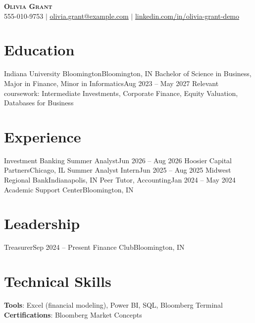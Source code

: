 

\begin{center}
    \textbf{\Huge \scshape Olivia Grant} \\ \vspace{1pt}
    \small 555-010-9753 $|$ \href{mailto:olivia.grant@example.com}{\underline{olivia.grant@example.com}} $|$
    \href{https://linkedin.com/in/olivia-grant-demo}{\underline{linkedin.com/in/olivia-grant-demo}}
\end{center}

\section{Education}
  \resumeSubHeadingListStart
    \resumeSubheading
      {Indiana University Bloomington}{Bloomington, IN}
      {Bachelor of Science in Business, Major in Finance, Minor in Informatics}{Aug 2023 -- May 2027}
  \resumeSubHeadingListEnd
  \small{Relevant coursework: Intermediate Investments, Corporate Finance, Equity Valuation, Databases for Business}

\section{Experience}
  \resumeSubHeadingListStart
    \resumeSubheading
      {Investment Banking Summer Analyst}{Jun 2026 -- Aug 2026}
      {Hoosier Capital Partners}{Chicago, IL}
      \resumeItemListStart
      \resumeItemListEnd
    \resumeSubheading
      {Summer Analyst Intern}{Jun 2025 -- Aug 2025}
      {Midwest Regional Bank}{Indianapolis, IN}
      \resumeItemListStart
      \resumeItemListEnd
    \resumeSubheading
      {Peer Tutor, Accounting}{Jan 2024 -- May 2024}
      {Academic Support Center}{Bloomington, IN}
      \resumeItemListStart
      \resumeItemListEnd
  \resumeSubHeadingListEnd

\section{Leadership}
  \resumeSubHeadingListStart
    \resumeSubheading
      {Treasurer}{Sep 2024 -- Present}
      {Finance Club}{Bloomington, IN}
      \resumeItemListStart
      \resumeItemListEnd
  \resumeSubHeadingListEnd

\section{Technical Skills}
 \begin{itemize}[leftmargin=0.15in, label={}]
    \small{\item{
     \textbf{Tools}{: Excel (financial modeling), Power BI, SQL, Bloomberg Terminal} \\
     \textbf{Certifications}{: Bloomberg Market Concepts}
    }}
 \end{itemize}

